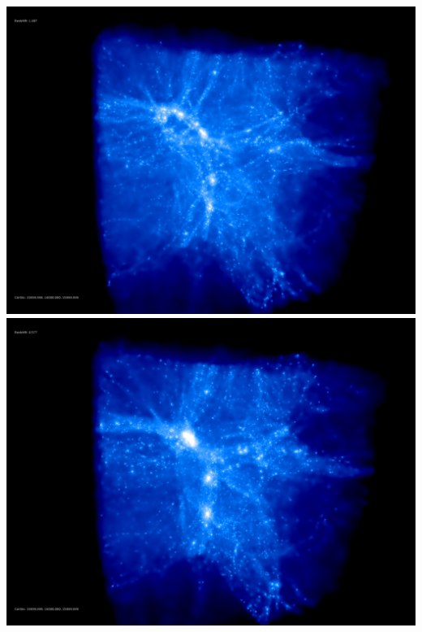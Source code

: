 \includegraphics[scale=0.1]{r256/h100/stages_20/50.jpg} 
\includegraphics[scale=0.1]{r256/h100/stages_20/100.jpg}  \\

